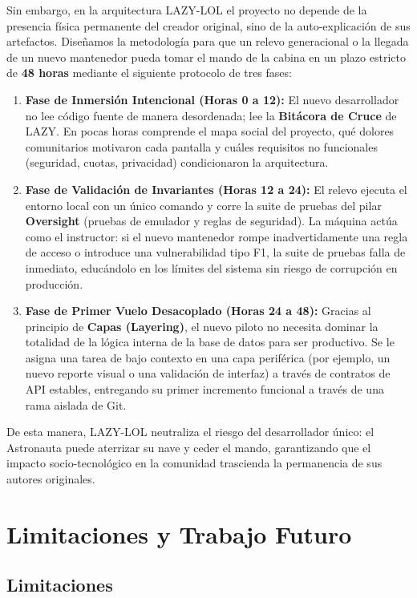 \documentclass[14pt,a4paper,oneside]{extbook}
\begin{document}
Sin embargo, en la arquitectura LAZY-LOL el proyecto no depende de la presencia física permanente del creador original, sino de la auto-explicación de sus artefactos. Diseñamos la metodología para que un relevo generacional o la llegada de un nuevo mantenedor pueda tomar el mando de la cabina en un plazo estricto de \textbf{48 horas} mediante el siguiente protocolo de tres fases:

\begin{enumerate}
    \item \textbf{Fase de Inmersión Intencional (Horas 0 a 12):} El nuevo desarrollador no lee código fuente de manera desordenada; lee la \textbf{Bitácora de Cruce} de LAZY. En pocas horas comprende el mapa social del proyecto, qué dolores comunitarios motivaron cada pantalla y cuáles requisitos no funcionales (seguridad, cuotas, privacidad) condicionaron la arquitectura.
    \item \textbf{Fase de Validación de Invariantes (Horas 12 a 24):} El relevo ejecuta el entorno local con un único comando y corre la suite de pruebas del pilar \textbf{Oversight} (pruebas de emulador y reglas de seguridad). La máquina actúa como el instructor: si el nuevo mantenedor rompe inadvertidamente una regla de acceso o introduce una vulnerabilidad tipo F1, la suite de pruebas falla de inmediato, educándolo en los límites del sistema sin riesgo de corrupción en producción.
    \item \textbf{Fase de Primer Vuelo Desacoplado (Horas 24 a 48):} Gracias al principio de \textbf{Capas (Layering)}, el nuevo piloto no necesita dominar la totalidad de la lógica interna de la base de datos para ser productivo. Se le asigna una tarea de bajo contexto en una capa periférica (por ejemplo, un nuevo reporte visual o una validación de interfaz) a través de contratos de API estables, entregando su primer incremento funcional a través de una rama aislada de Git.
\end{enumerate}

De esta manera, LAZY-LOL neutraliza el riesgo del desarrollador único: el Astronauta puede aterrizar su nave y ceder el mando, garantizando que el impacto socio-tecnológico en la comunidad trascienda la permanencia de sus autores originales.


\chapter{Limitaciones y Trabajo Futuro}

\section{Limitaciones}
\end{document}

